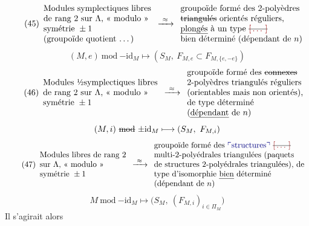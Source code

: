 \documentclass[11pt,a4paper]{article}
\begin{document}
\[
\tag{45}
\begin{array}{l}
\text{Modules symplectiques libres}\\
\text{de rang 2 sur } \Lambda\text{, « modulo »}\\
\text{symétrie } \pm1\\
\text{(groupoïde quotient …)}
\end{array}
\xrightarrow{\ \approx\ }
\begin{array}{l}
\text{groupoïde formé des 2-polyèdres}\\
\text{\struck{triangulés} orientés réguliers,}\\
\text{\uncertain{plongés} à un type \struck{\ill{}}}\\
\text{bien déterminé (dépendant de } n\text{)}
\end{array}
\]
\[
(M, e)\ \text{mod}\ {-\mathrm{id}_M} \longmapsto (S_M,\ F_{M,e}\subset F_{M,\{e,-e\}})
\]
\[
\tag{46}
\begin{array}{l}
\text{Modules ½symplectiques libres}\\
\text{de rang 2 sur } \Lambda\text{, « modulo »}\\
\text{symétrie } \pm1
\end{array}
\xrightarrow{\ \approx\ }
\begin{array}{l}
\text{groupoïde formé des \struck{connexes}}\\
\text{2-polyèdres triangulés réguliers}\\
\text{(orientables mais non orientés),}\\
\text{de type déterminé}\\
\text{(\uncertain{dépendant} de } n\text{)}
\end{array}
\]
\[
(M, i)\ \text{\struck{mod}}\ {\pm\mathrm{id}_M} \longmapsto (S_M,\ F_{M,i})
\]
\[
\tag{47}
\begin{array}{l}
\text{Modules libres de rang 2}\\
\text{sur } \Lambda\text{, « modulo »}\\
\text{symétrie } \pm1
\end{array}
\xrightarrow{\ \approx\ }
\begin{array}{l}
\text{groupoïde formé des \add{structures} \struck{\ill{}}}\\
\text{multi-2-polyédrales triangulées (paquets}\\
\text{de structures 2-polyédrales triangulées), de}\\
\text{type d'isomorphie \uncertain{bien} déterminé}\\
\text{(dépendant de } n\text{)}
\end{array}
\]
\[
M\ \text{mod}\ {-\mathrm{id}_M} \longmapsto \bigl(S_M,\ (F_{M,i})_{i\in\Pi_M}\bigr)
\]
Il s'agirait alors
\end{document}
